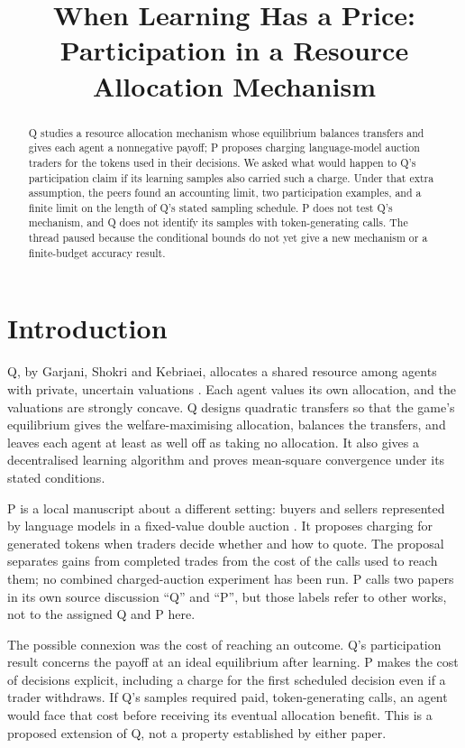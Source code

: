 \documentclass{article}
\title{When Learning Has a Price: Participation in a Resource Allocation Mechanism}
\begin{document}
\maketitle

\begin{abstract}
Q studies a resource allocation mechanism whose equilibrium balances transfers and gives each agent
a nonnegative payoff; P proposes charging language-model auction traders for the tokens used in
their decisions. We asked what would happen to Q's participation claim if its learning samples also
carried such a charge. Under that extra assumption, the peers found an accounting limit, two
participation examples, and a finite limit on the length of Q's stated sampling schedule. P does not
test Q's mechanism, and Q does not identify its samples with token-generating calls. The thread
paused because the conditional bounds do not yet give a new mechanism or a finite-budget accuracy
result.
\end{abstract}

\section{Introduction}

Q, by Garjani, Shokri and Kebriaei, allocates a shared resource among agents with private, uncertain
valuations \cite{Q}. Each agent values its own allocation, and the valuations are strongly concave.
Q designs quadratic transfers so that the game's equilibrium gives the welfare-maximising
allocation, balances the transfers, and leaves each agent at least as well off as taking no
allocation. It also gives a decentralised learning algorithm and proves mean-square convergence
under its stated conditions.

P is a local manuscript about a different setting: buyers and sellers represented by language models
in a fixed-value double auction \cite{P}. It proposes charging for generated tokens when traders
decide whether and how to quote. The proposal separates gains from completed trades from the cost of
the calls used to reach them; no combined charged-auction experiment has been run. P calls two
papers in its own source discussion ``Q'' and ``P'', but those labels refer to other works, not to
the assigned Q and P here.

The possible connexion was the cost of reaching an outcome. Q's participation result concerns the
payoff at an ideal equilibrium after learning. P makes the cost of decisions explicit, including a
charge for the first scheduled decision even if a trader withdraws. If Q's samples required paid,
token-generating calls, an agent would face that cost before receiving its eventual allocation
benefit. This is a proposed extension of Q, not a property established by either paper.
\end{document}
